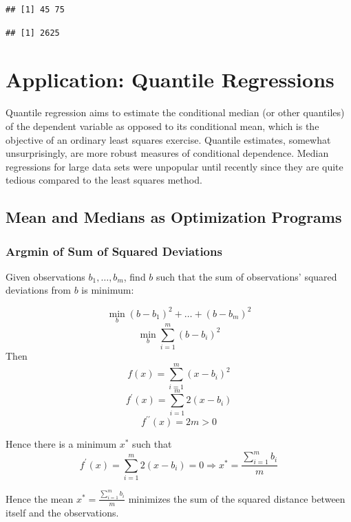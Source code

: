 \documentclass[11pt,]{article}
\newenvironment{Shaded}{\begin{snugshade}}{\end{snugshade}}
\newcommand{\OperatorTok}[1]{\textcolor[rgb]{0.81,0.36,0.00}{\textbf{#1}}}
\newcommand{\NormalTok}[1]{#1}
\begin{document}
\begin{verbatim}
## [1] 45 75
\end{verbatim}

\begin{Shaded}
\end{Shaded}

\begin{verbatim}
## [1] 2625
\end{verbatim}

\section{Application: Quantile
Regressions}\label{application-quantile-regressions}

Quantile regression aims to estimate the conditional median (or other
quantiles) of the dependent variable as opposed to its conditional mean,
which is the objective of an ordinary least squares exercise. Quantile
estimates, somewhat unsurprisingly, are more robust measures of
conditional dependence. Median regressions for large data sets were
unpopular until recently since they are quite tedious compared to the
least squares method.

\subsection{Mean and Medians as Optimization
Programs}\label{mean-and-medians-as-optimization-programs}

\subsubsection{Argmin of Sum of Squared
Deviations}\label{argmin-of-sum-of-squared-deviations}

Given observations \(b_1,\hdots,b_m\), find \(b\) such that the sum of
observations' squared deviations from \(b\) is minimum:

\[\min_b{} (b-b_1)^2+\hdots+(b-b_m)^2\]
\[\min_b{} \sum_{i=1}^m (b-b_i)^2\] Then
\[f(x) = \sum_{i=1}^m (x-b_i)^2\]
\[f^{\prime}(x) = \sum_{i=1}^m 2(x-b_i)\]
\[f^{\prime\prime}(x) = 2m > 0\]

Hence there is a minimum \(x^*\) such that
\[f^{\prime}(x) = \sum_{i=1}^m 2(x-b_i) = 0 \Rightarrow x^* = \frac{\sum_{i=1}^m b_i}{m}\]

Hence the mean \(x^* = \frac{\sum_{i=1}^m b_i}{m}\) minimizes the sum of
the squared distance between itself and the observations.
\end{document}
